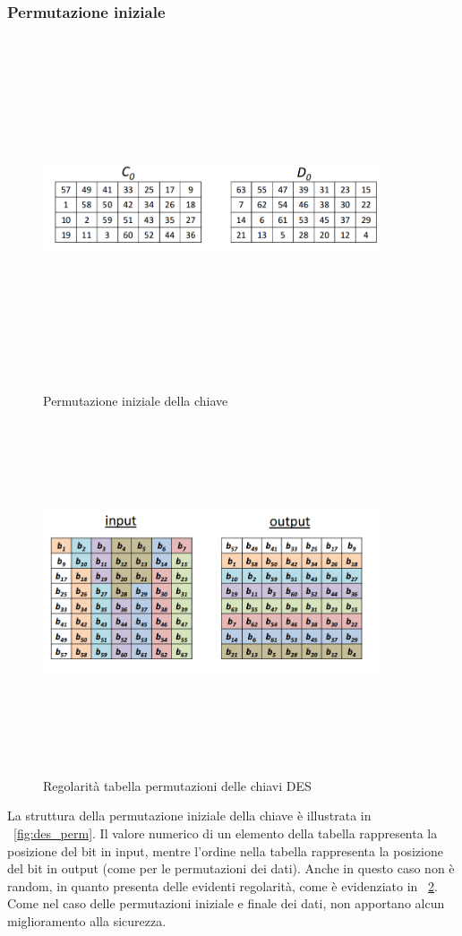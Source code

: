 \subsubsection{Permutazione iniziale}
\begin{figure}[htbp]
	\centering%
	\subfigure%
	{\includegraphics[height=10cm, width=10cm, keepaspectratio]{Immagini/chiave_segreta/des_perm_keys.png}}
	\caption{Permutazione iniziale della chiave \label{fig:des_perm_keys}} 	
\end{figure}
\begin{figure}[htbp]
	\centering%
	\subfigure%
	{\includegraphics[height=10cm, width=10cm, keepaspectratio]{Immagini/chiave_segreta/des_perm_keys_2.png}}
	\caption{Regolarità tabella permutazioni delle chiavi DES \label{fig:des_perm_keys_2}} 	
\end{figure}
La struttura della permutazione iniziale della chiave è illustrata in \figurename ~\ref{fig:des_perm}. Il valore numerico di un elemento della tabella rappresenta la posizione del bit in input, mentre l’ordine nella tabella rappresenta la posizione del bit in output (come per le permutazioni dei dati). Anche in questo caso non è random, in quanto presenta delle evidenti regolarità, come è evidenziato in \figurename ~\ref{fig:des_perm_keys_2}. Come nel caso delle permutazioni iniziale e finale dei dati, non apportano alcun miglioramento alla sicurezza.
